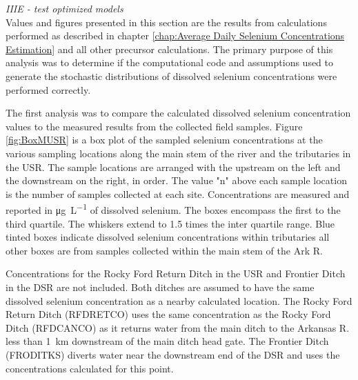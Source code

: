 \begin{linenumbers}
\emph{IIIE - test optimized models}\\

Values and figures presented in this section are the results from calculations performed as described in chapter \ref{chap:Average Daily Selenium Concentrations Estimation} and all other precursor calculations.  The primary purpose of this analysis was to determine if the computational code and assumptions used to generate the stochastic distributions of dissolved selenium concentrations were performed correctly.

The first analysis was to compare the calculated dissolved selenium concentration values to the measured results from the collected field samples.  Figure \ref{fig:BoxMUSR} is a box plot of the sampled selenium concentrations at the various sampling locations along the main stem of the river and the tributaries in the USR.  The sample locations are arranged with the upstream on the left and the downstream on the right, in order.  The value "n" above each sample location is the number of samples collected at each site.  Concentrations are measured and reported in \si{\micro\gram\per\liter} of dissolved selenium.  The boxes encompass the first to the third quartile.  The whiskers extend to 1.5 times the inter quartile range.  Blue tinted boxes indicate dissolved selenium concentrations within tributaries all other boxes are from samples collected within the main stem of the Ark R.

Concentrations for the Rocky Ford Return Ditch in the USR and Frontier Ditch in the DSR are not included.  Both ditches are assumed to have the same dissolved selenium concentration as a nearby calculated location.  The Rocky Ford Return Ditch (RFDRETCO) uses the same concentration as the Rocky Ford Ditch (RFDCANCO) as it returns water from the main ditch to the Arkansas R. less than \SI{1}{\kilo\meter} downstream of the main ditch head gate.  The Frontier Ditch (FRODITKS) diverts water near the downstream end of the DSR and uses the concentrations calculated for this point.


\end{linenumbers}
